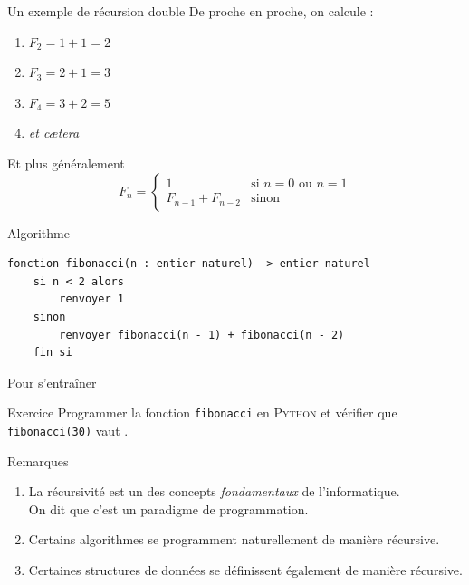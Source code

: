 \documentclass[10pt]{beamer}
\begin{document}
\begin{frame}{Un exemple de récursion double}
De proche en proche, on calcule :\pause
\begin{enumerate}[--]
	\item $F_2=1+1=2$\pause
    \item  $F_3=2+1=3$\pause
    \item $F_4=3+2=5$\pause
    \item \textit{et c\ae tera}\pause
\end{enumerate}
Et plus généralement\pause
$$F_n=\begin{cases}
1 & \mbox{si } n=0\mbox{ ou }n=1\\
F_{n-1}+F_{n-2} &\mbox{sinon}
\end{cases}$$
\end{frame}
\begin{frame}[fragile]{Algorithme}
\begin{verbatim}
fonction fibonacci(n : entier naturel) -> entier naturel
    si n < 2 alors
        renvoyer 1
    sinon
        renvoyer fibonacci(n - 1) + fibonacci(n - 2)
    fin si
\end{verbatim}
\end{frame}




\begin{frame}{Pour s'entraîner}
\begin{alertblock}{Exercice}
Programmer la fonction  \texttt{fibonacci} en \textsc{Python} et vérifier que  \texttt{fibonacci(30)} vaut .
\end{alertblock}
\end{frame}




\begin{frame}{Remarques}
\begin{enumerate}[--]
	\item La récursivité est un des concepts \textit{fondamentaux} de l'informatique.\\\pause
            On dit que c'est un \alert{paradigme de programmation}.\pause
    \item Certains algorithmes se programment naturellement de manière récursive.\pause
    \item Certaines \alert{structures de données} se définissent également de manière récursive.
\end{enumerate}
\end{frame}
\end{document}
